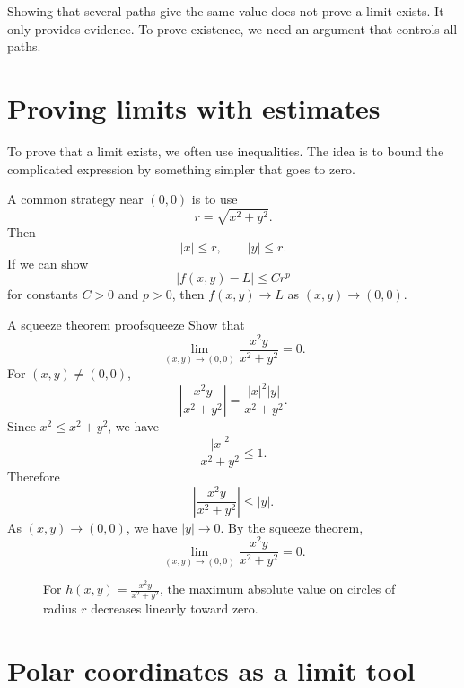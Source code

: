 \documentclass[11pt]{article}
\newcommand{\abs}[1]{\left\lvert #1\right\rvert}
\begin{document}
\begin{warningbox}
Showing that several paths give the same value does not prove a limit exists. It only provides evidence. To prove existence, we need an argument that controls all paths.
\end{warningbox}

\section{Proving limits with estimates}

To prove that a limit exists, we often use inequalities. The idea is to bound the complicated expression by something simpler that goes to zero.

A common strategy near $(0,0)$ is to use
\[
r=\sqrt{x^2+y^2}.
\]
Then
\[
\abs{x}\le r, \qquad \abs{y}\le r.
\]
If we can show
\[
\abs{f(x,y)-L}\le C r^p
\]
for constants $C>0$ and $p>0$, then $f(x,y)\to L$ as $(x,y)\to(0,0)$.

\begin{workedexample}{A squeeze theorem proof}{squeeze}
Show that
\[
\lim_{(x,y)\to(0,0)} \frac{x^2y}{x^2+y^2}=0.
\]
For $(x,y)\ne(0,0)$,
\[
\left|\frac{x^2y}{x^2+y^2}\right|
=
\frac{\abs{x}^2\abs{y}}{x^2+y^2}.
\]
Since $x^2\le x^2+y^2$, we have
\[
\frac{\abs{x}^2}{x^2+y^2}\le1.
\]
Therefore
\[
\left|\frac{x^2y}{x^2+y^2}\right|\le \abs{y}.
\]
As $(x,y)\to(0,0)$, we have $\abs{y}\to0$. By the squeeze theorem,
\[
\lim_{(x,y)\to(0,0)} \frac{x^2y}{x^2+y^2}=0.
\]
\end{workedexample}

\begin{figure}[H]
\centering
{}
\caption{For $h(x,y)=\frac{x^2y}{x^2+y^2}$, the maximum absolute value on circles of radius $r$ decreases linearly toward zero.}
\end{figure}

\section{Polar coordinates as a limit tool}
\end{document}
